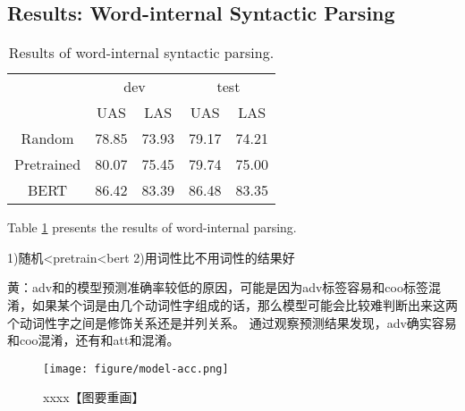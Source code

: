 \subsection{Results: Word-internal Syntactic Parsing}
\setlength{\tabcolsep}{5pt}
\begin{table}[tb]
\begin{center}
\begin{small}
\begin{tabular}{c | *{2}{c}  | *{2}{c} }
\hline
\multirow{2}{*}{} 
& \multicolumn{2}{|c}{dev }
& \multicolumn{2}{|c}{test} \\
\cmidrule(lr){1-2} \cmidrule(lr){4-5}
& UAS & LAS & UAS & LAS \\
\hline
Random & 78.85 & 73.93  & 79.17 & 74.21 \\
Pretrained & 80.07 & 75.45 & 79.74 & 75.00 \\
BERT & 86.42 & 83.39 & 86.48 & 83.35 \\
\hline
\end{tabular}
\end{small}
\caption{Results of word-internal syntactic parsing.}
\label{iwdp-result}
\end{center}
\end{table}

Table \ref{iwdp-result} presents the results of word-internal parsing. 




1)随机<pretrain<bert
2)用词性比不用词性的结果好




黄：adv和的模型预测准确率较低的原因，可能是因为adv标签容易和coo标签混淆，如果某个词是由几个动词性字组成的话，那么模型可能会比较难判断出来这两个动词性字之间是修饰关系还是并列关系。
通过观察预测结果发现，adv确实容易和coo混淆，还有和att和混淆。



\begin{figure}
		\centering
		\texttt{[image: figure/model-acc.png]}
		\caption{xxxx【图要重画】}
		\label{fig:model-acc}
\end{figure}

